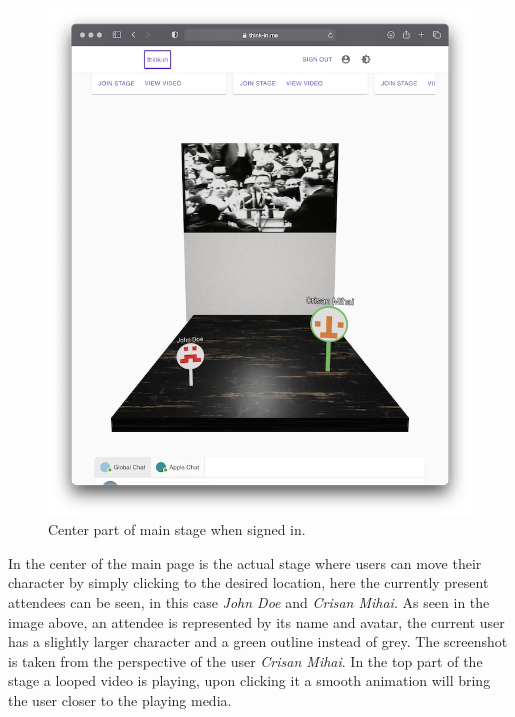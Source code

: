 \begin{figure}[H]
	\includegraphics[width=\textwidth,keepaspectratio]{images/business_logic/main_page_signed_in_center.png}
	\caption{Center part of main stage when signed in.}
	\label{figure:website-main-page-center}
\end{figure}

In the center of the main page is the actual stage where users can move their character by simply clicking to the desired location, here the currently present attendees can be seen, in this case \textit{John Doe} and \textit{Crisan Mihai}. As seen in the image above, an attendee is represented by its name and avatar, the current user has a slightly larger character and a green outline instead of grey. The screenshot is taken from the perspective of the user \textit{Crisan Mihai}. In the top part of the stage a looped video is playing, upon clicking it a smooth animation will bring the user closer to the playing media.

